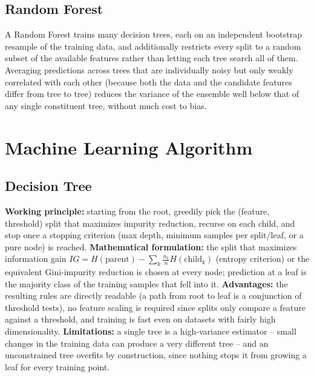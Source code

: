 \documentclass[11pt,a4paper]{article}
\begin{document}
\subsection{Random Forest}
A Random Forest trains many decision trees, each on an independent bootstrap resample of the training data, and additionally restricts every split to a random subset of the available features rather than letting each tree search all of them. Averaging predictions across trees that are individually noisy but only weakly correlated with each other (because both the data and the candidate features differ from tree to tree) reduces the variance of the ensemble well below that of any single constituent tree, without much cost to bias.

\section{Machine Learning Algorithm}

\subsection{Decision Tree}
\textbf{Working principle:} starting from the root, greedily pick the (feature, threshold) split that maximizes impurity reduction, recurse on each child, and stop once a stopping criterion (max depth, minimum samples per split/leaf, or a pure node) is reached.
\textbf{Mathematical formulation:} the split that maximizes information gain $IG = H(\text{parent}) - \sum_{k} \frac{n_k}{n} H(\text{child}_k)$ (entropy criterion) or the equivalent Gini-impurity reduction is chosen at every node; prediction at a leaf is the majority class of the training samples that fell into it.
\textbf{Advantages:} the resulting rules are directly readable (a path from root to leaf is a conjunction of threshold tests), no feature scaling is required since splits only compare a feature against a threshold, and training is fast even on datasets with fairly high dimensionality.
\textbf{Limitations:} a single tree is a high-variance estimator -- small changes in the training data can produce a very different tree -- and an unconstrained tree overfits by construction, since nothing stops it from growing a leaf for every training point.
\end{document}
